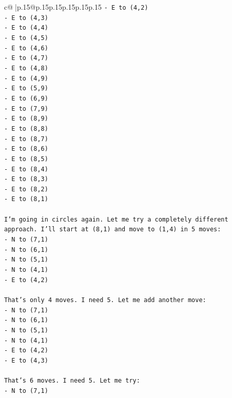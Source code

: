 \documentclass{article}
\begin{document}
{\begin{supertabular}{c@{$\;$}|p{.15\linewidth}@{}p{.15\linewidth}p{.15\linewidth}p{.15\linewidth}p{.15\linewidth}p{.15\linewidth}}
{{{\texttt{{-} E to (4,2)} \\
\texttt{{-} E to (4,3)} \\
\texttt{{-} E to (4,4)} \\
\texttt{{-} E to (4,5)} \\
\texttt{{-} E to (4,6)} \\
\texttt{{-} E to (4,7)} \\
\texttt{{-} E to (4,8)} \\
\texttt{{-} E to (4,9)} \\
\texttt{{-} E to (5,9)} \\
\texttt{{-} E to (6,9)} \\
\texttt{{-} E to (7,9)} \\
\texttt{{-} E to (8,9)} \\
\texttt{{-} E to (8,8)} \\
\texttt{{-} E to (8,7)} \\
\texttt{{-} E to (8,6)} \\
\texttt{{-} E to (8,5)} \\
\texttt{{-} E to (8,4)} \\
\texttt{{-} E to (8,3)} \\
\texttt{{-} E to (8,2)} \\
\texttt{{-} E to (8,1)} \\
\\ 
\texttt{I'm going in circles again. Let me try a completely different approach. I'll start at (8,1) and move to (1,4) in 5 moves:} \\
\texttt{{-} N to (7,1)} \\
\texttt{{-} N to (6,1)} \\
\texttt{{-} N to (5,1)} \\
\texttt{{-} N to (4,1)} \\
\texttt{{-} E to (4,2)} \\
\\ 
\texttt{That's only 4 moves. I need 5. Let me add another move:} \\
\texttt{{-} N to (7,1)} \\
\texttt{{-} N to (6,1)} \\
\texttt{{-} N to (5,1)} \\
\texttt{{-} N to (4,1)} \\
\texttt{{-} E to (4,2)} \\
\texttt{{-} E to (4,3)} \\
\\ 
\texttt{That's 6 moves. I need 5. Let me try:} \\
\texttt{{-} N to (7,1)} \\
}}}
\end{supertabular}}
\end{document}
